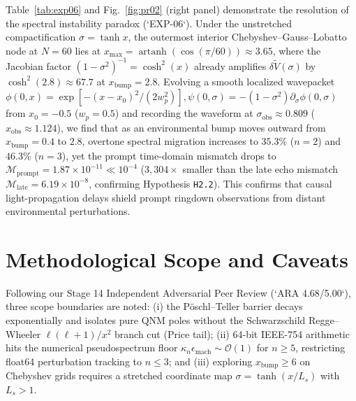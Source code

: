\documentclass[11pt,a4paper]{article}
\begin{document}
Table~\ref{tab:exp06} and Fig.~\ref{fig:pr02} (right panel) demonstrate the resolution of the spectral instability paradox (`EXP-06`). Under the unstretched compactification $\sigma = \tanh x$, the outermost interior Chebyshev--Gauss--Lobatto node at $N = 60$ lies at $x_{\max} = \operatorname{artanh}(\cos(\pi/60)) \approx 3.65$, where the Jacobian factor $(1-\sigma^2)^{-1} = \cosh^2(x)$ already amplifies $\delta\tilde{V}(\sigma)$ by $\cosh^2(2.8) \approx 67.7$ at $x_{\mathrm{bump}} = 2.8$. Evolving a smooth localized wavepacket $\phi(0, x) = \exp[-(x - x_0)^2/(2w_p^2)], \psi(0, \sigma) = -(1-\sigma^2)\partial_\sigma\phi(0, \sigma)$ from $x_0 = -0.5$ ($w_p = 0.5$) and recording the waveform at $\sigma_{\mathrm{obs}} \approx 0.809$ ($x_{\mathrm{obs}} \approx 1.124$), we find that as an environmental bump moves outward from $x_{\mathrm{bump}} = 0.4$ to $2.8$, overtone spectral migration increases to $35.3\%$ ($n=2$) and $46.3\%$ ($n=3$), yet the prompt time-domain mismatch drops to $\mathcal{M}_{\mathrm{prompt}} = 1.87 \times 10^{-11} \ll 10^{-4}$ ($3,304\times$ smaller than the late echo mismatch $\mathcal{M}_{\mathrm{late}} = 6.19 \times 10^{-8}$, confirming Hypothesis \texttt{H2.2}). This confirms that causal light-propagation delays shield prompt ringdown observations from distant environmental perturbations.

\section{Methodological Scope and Caveats}
Following our Stage 14 Independent Adversarial Peer Review (`ARA 4.68/5.00`), three scope boundaries are noted: (i) the P\"oschl--Teller barrier decays exponentially and isolates pure QNM poles without the Schwarzschild Regge--Wheeler $\ell(\ell+1)/x^2$ branch cut (Price tail); (ii) 64-bit IEEE-754 arithmetic hits the numerical pseudospectrum floor $\kappa_n \epsilon_{\mathrm{mach}} \sim \mathcal{O}(1)$ for $n \ge 5$, restricting float64 perturbation tracking to $n \le 3$; and (iii) exploring $x_{\mathrm{bump}} \ge 6$ on Chebyshev grids requires a stretched coordinate map $\sigma = \tanh(x/L_s)$ with $L_s > 1$.



\end{document}
